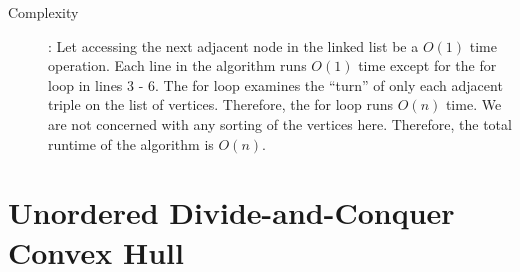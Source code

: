\documentclass [12pt]{article}
\begin{document}
\begin{enumerate}[label=(\alph*)]
\begin{description}
                \item[Complexity]: Let accessing the next adjacent node in the linked list be a $O(1)$ time operation. Each line in the algorithm runs $O(1)$ time except for the for loop in lines 3 - 6. The for loop examines the ``turn'' of only each adjacent triple on the list of vertices. Therefore, the for loop runs $O(n)$ time. We are not concerned with any sorting of the vertices here. Therefore, the total runtime of the algorithm is $O(n)$.
            \end{description}

        \end{enumerate}

    \pagebreak



    \section{Unordered Divide-and-Conquer Convex Hull}
    \label{sec:two}
\end{document}
